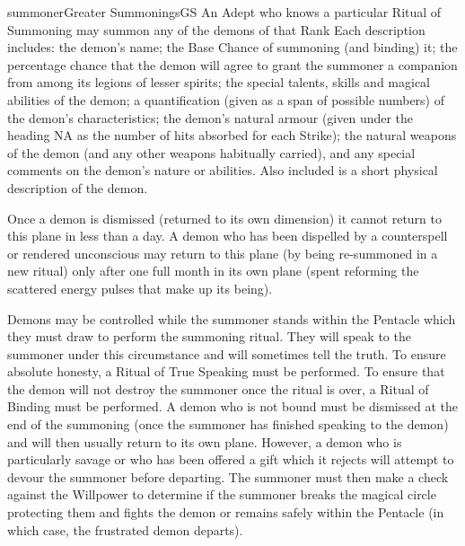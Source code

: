 \begin{college}[1.0]{summoner}{Greater Summonings}{GS}
An Adept who knows a particular Ritual of Summoning may summon any of
the demons of that Rank Each description includes: the demon's name;
the Base Chance of summoning (and binding) it; the percentage chance
that the demon will agree to grant the summoner a companion from among
its legions of lesser spirits; the special talents, skills and magical
abilities of the demon; a quantification (given as a span of possible
numbers) of the demon's characteristics; the demon's natural armour
(given under the heading NA as the number of hits absorbed for each
Strike); the natural weapons of the demon (and any other weapons
habitually carried), and any special comments on the demon's nature or
abilities.  Also included is a short physical description of the
demon.

Once a demon is dismissed (returned to its own dimension) it cannot
return to this plane in less than a day.  A demon who has been
dispelled by a counterspell or rendered unconscious may return to this
plane (by being re-summoned in a new ritual) only after one full month
in its own plane (spent reforming the scattered energy pulses that
make up its being).

Demons may be controlled while the summoner stands within the Pentacle
which they must draw to perform the summoning ritual.  They will speak
to the summoner under this circumstance and will sometimes tell the
truth.  To ensure absolute honesty, a Ritual of True Speaking must be
performed.  To ensure that the demon will not destroy the summoner
once the ritual is over, a Ritual of Binding must be performed.  A
demon who is not bound must be dismissed at the end of the summoning
(once the summoner has finished speaking to the demon) and will then
usually return to its own plane.  However, a demon who is particularly
savage or who has been offered a gift which it rejects will attempt to
devour the summoner before departing.  The summoner must then make a
check against the Willpower to determine if the summoner breaks the
magical circle protecting them and fights the demon or remains safely
within the Pentacle (in which case, the frustrated demon departs).


\end{college}
